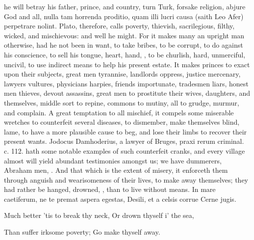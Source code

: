 {he will betray his father, prince, and country, turn Turk, forsake
religion, abjure God and all, nulla tam horrenda proditio, quam illi
lucri causa (saith Leo Afer) perpetrare nolint. Plato,
therefore, calls poverty, thievish, sacrilegious, filthy, wicked, and
mischievous: and well he might. For it makes many an upright man
otherwise, had he not been in want, to take bribes, to be corrupt, to
do against his conscience, to sell his tongue, heart, hand, \etc{}, to be
churlish, hard, unmerciful, uncivil, to use indirect means to help his
present estate. It makes princes to exact upon their subjects, great
men tyrannise, landlords oppress, justice mercenary, lawyers vultures,
physicians harpies, friends importunate, tradesmen liars, honest men
thieves, devout assassins, great men to prostitute their wives,
daughters, and themselves, middle sort to repine, commons to mutiny,
all to grudge, murmur, and complain. A great temptation to all
mischief, it compels some miserable wretches to counterfeit several
diseases, to dismember, make themselves blind, lame, to have a more
plausible cause to beg, and lose their limbs to recover their present
wants. Jodocus Damhoderius, a lawyer of Bruges, praxi rerum criminal.
c. 112. hath some notable examples of such counterfeit cranks, and
every village almost will yield abundant testimonies amongst us; we
have dummerers, Abraham men, \etc{}. And that which is the extent of
misery, it enforceth them through anguish and wearisomeness of their
lives, to make away themselves; they had rather be hanged, drowned,
\etc{}, than to live without means.
In mare caetiferum, ne te premat aspera egestas,
Desili, et a celsis corrue Cerne jugis.


Much better 'tis to break thy neck,
Or drown thyself i' the sea,

Than suffer irksome poverty;
Go make thyself away.

}
